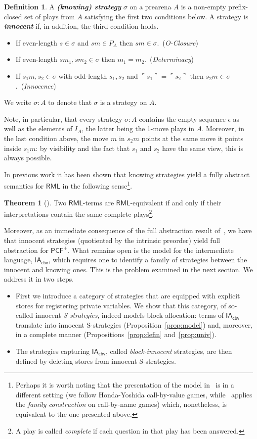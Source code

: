 \documentclass{CSML}
\theoremstyle{definition}\newtheorem{definition}[thm]{Definition}
\theoremstyle{definition}\newtheorem{example}[thm]{Example}
\theoremstyle{definition}\newtheorem{proposition}[thm]{Proposition}
\theoremstyle{definition}\newtheorem{lemma}[thm]{Lemma}
\theoremstyle{definition}\newtheorem{theorem}[thm]{Theorem}
\theoremstyle{definition}\newtheorem{corollary}[thm]{Corollary}
\theoremstyle{definition}\newtheorem{remark}[thm]{Remark}
\newcommand\nt[1]{#1}
\newcommand\plays[1]{P_{#1}}
\newcommand\boldemph[1]{\emph{\textbf{#1}}}
\newcommand\pcfplus{\mathsf{PCF}^+}
\newcommand\iacbv{\mathsf{IA}_{\mathsf{cbv}}}
\newcommand\rml{\mathsf{RML}}
\newcommand\pview[1]{\ulcorner{#1}\urcorner}
\newcommand\pv[1]{\pview{#1}}
\begin{document}
\begin{definition}
A \boldemph{(knowing) strategy} $\sigma$ on a prearena $A$ is a {non-empty} prefix-closed set of plays from $A$ satisfying the first two conditions below. A strategy is \boldemph{innocent} if, in addition, the third condition holds.
\begin{itemize}
\item If even-length $s\in\sigma$ and $sm\in\plays{A}$ then $sm\in\sigma$.\
(\emph{O-Closure})
 \item If even-length $sm_1,sm_2\in\sigma$ then $m_1=m_2$.\ (\emph{Determinacy})
 \item If $s_1m,s_2\in\sigma$ with odd-length $s_1,s_2$ and $\pv{s_1}=\pv{s_2}$ then $s_2m\in\sigma$.\ (\emph{Innocence})
\end{itemize}
We write $\sigma:A$ to denote that $\sigma$ is a strategy on $A$.
\end{definition}


Note, in particular, that every strategy $\sigma:A$ contains the empty sequence $\epsilon$ as well as the elements of $I_A$, the latter being the 1-move plays in $A$.
\nt{Moreover, in the last condition above, the move $m$ in $s_2m$ points at the same move it points inside $s_1m$: by visibility and the fact that $s_1$ and $s_2$ have the same view, this is always possible.}

{In previous work it has been shown that knowing strategies yield a fully abstract semantics for $\rml$ in the following sense\footnote{Perhaps it is worth noting that the presentation of the model in~\cite{AM97b} is in a different setting
  (we follow Honda-Yoshida call-by-value games, while~\cite{AM97b} applies the \emph{family construction} on call-by-name games) which, nonetheless, is equivalent to the one presented above.}.
  \nt{
  \begin{theorem}[\cite{AM97b}]
Two $\rml$-terms are $\rml$-equivalent
  if and only if their interpretations contain the same complete plays\footnote{A play is called \emph{complete} if each question in that play has been answered.}. 
  \end{theorem}
Moreover, as an immediate consequence of the full abstraction result of~\cite{HY97}, we have that innocent strategies (quotiented by the intrinsic preorder)
yield full abstraction for $\pcfplus$.}
What remains open is the model for the intermediate language, $\iacbv$, which requires one to identify a family of strategies between the innocent and knowing ones.
This is the problem examined in the next section. We address it in two steps.
\begin{itemize}
\item First we introduce a category of strategies that are equipped with explicit stores for registering private variables. 
We show that this category, of so-called innocent \emph{S-strategies}, indeed models block allocation: terms of $\iacbv$ translate into innocent S-strategies (Proposition~\ref{prop:model}) and, moreover, in a complete manner (Propositions~\ref{prop:defin} and~\ref{prop:univ}). 
\item The strategies capturing $\iacbv$, called \emph{block-innocent} strategies, are then defined by deleting stores from innocent S-strategies.
\end{itemize}
}
\end{document}

